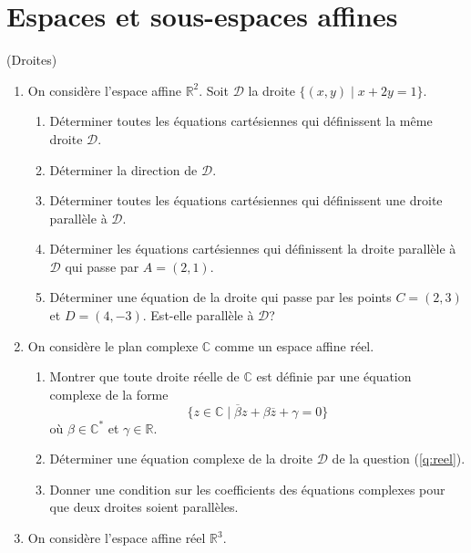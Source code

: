 \documentclass[a4paper,12pt,reqno]{amsart}
\begin{document}

\section{Espaces et sous-espaces affines}

\begin{exo} (Droites)

  \begin{enumerate}
    \item\label{q:reel} On considère l'espace affine $\mathbb{R}^{2}$. Soit $\mathcal{D}$ la droite $\big\{(x,y) \;\big|\; x+2y=1\big\}$.
    \begin{enumerate}
      \item Déterminer toutes les équations cartésiennes qui définissent la même droite $\mathcal{D}$.
      \item Déterminer la direction de $\mathcal{D}$.
      \item Déterminer toutes les équations cartésiennes qui définissent une droite parallèle à $\mathcal{D}$.
      \item Déterminer les équations cartésiennes qui définissent la droite parallèle à $\mathcal{D}$ qui passe par $A=(2,1)$.
      \item Déterminer une équation de la droite qui passe par les points $C=(2,3)$ et $D=(4,-3)$. Est-elle parallèle à $\mathcal{D}$?
    \end{enumerate}
    \item On considère le plan complexe $\mathbb{C}$ comme un espace affine réel.
    \begin{enumerate}
      \item Montrer que toute droite réelle de $\mathbb{C}$ est définie par une équation complexe de la forme
        \[
          \big\{z \in \mathbb{C} \;\big|\; \overline{\beta}z+\beta\overline{z}+\gamma=0\big\}
        \]
        où $\beta \in \mathbb{C}^{*}$ et $\gamma \in \mathbb{R}$.
      \item Déterminer une équation complexe de la droite $\mathcal{D}$ de la question (\ref{q:reel}).
      \item Donner une condition sur les coefficients des équations complexes pour que deux droites soient parallèles.
    \end{enumerate}
    \item On considère l'espace affine réel $\mathbb{R}^{3}$.

\end{enumerate}
\end{exo}
\end{document}
